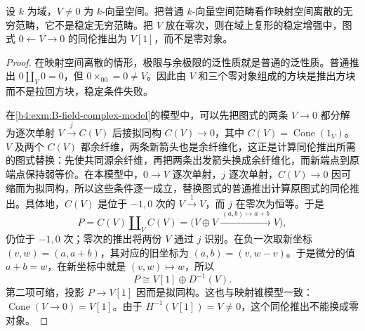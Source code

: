 \begin{proposition}\label{b4:prop:B-ordinary-stability-obstruction}
	设 \(k\) 为域，\(V\ne0\) 为 \(k\)-向量空间。把普通 \(k\)-向量空间范畴看作映射空间离散的无穷范畴，它不是稳定无穷范畴。把 \(V\) 放在零次，则在域上复形的稳定增强中，图式 \(0\leftarrow V\to0\) 的同伦推出为 \(V[1]\)，而不是零对象。
\end{proposition}
\begin{proof}
	在映射空间离散的情形，极限与余极限的泛性质就是普通的泛性质。普通推出 \(0\amalg_V0=0\)，但 \(0\times_00=0\ne V\)。因此由 \(V\) 和三个零对象组成的方块是推出方块而不是拉回方块，稳定条件失败。

	在\cref{b4:exm:B-field-complex-model}的模型中，可以先把图式的两条 \(V\to0\) 都分解为逐次单射 \(V\xrightarrow{j}C(V)\) 后接拟同构 \(C(V)\to0\)，其中 \(C(V)=\operatorname{Cone}(1_V)\)。\(V\) 及两个 \(C(V)\) 都余纤维，两条新箭头也是余纤维化，这正是计算同伦推出所需的图式替换：先使共同源余纤维，再把两条出发箭头换成余纤维化，而新端点到原端点保持弱等价。在本模型中，\(0\to V\) 逐次单射，\(j\) 逐次单射，\(C(V)\to0\) 因可缩而为拟同构，所以这些条件逐一成立，替换图式的普通推出计算原图式的同伦推出。具体地，\(C(V)\) 是位于 \(-1,0\) 次的 \(V\xrightarrow{1}V\)，而 \(j\) 在零次为恒等。于是
	\[
		P=C(V)\amalg_VC(V) =\bigl(V\oplus V\xrightarrow{\ (a,b)\mapsto a+b\ }V\bigr),
	\]
	仍位于 \(-1,0\) 次；零次的推出将两份 \(V\) 通过 \(j\) 识别。在负一次取新坐标 \((v,w)=(a,a+b)\)，其对应的旧坐标为 \((a,b)=(v,w-v)\)。于是微分的值 \(a+b=w\)，在新坐标中就是 \((v,w)\mapsto w\)，所以
	\[
		P\cong V[1]\oplus D^{-1}(V).
	\]
	第二项可缩，投影 \(P\to V[1]\) 因而是拟同构。这也与映射锥模型一致：\(\operatorname{Cone}(V\to0)=V[1]\)。由于 \(H^{-1}(V[1])=V\ne0\)，这个同伦推出不能换成零对象。
\end{proof}
